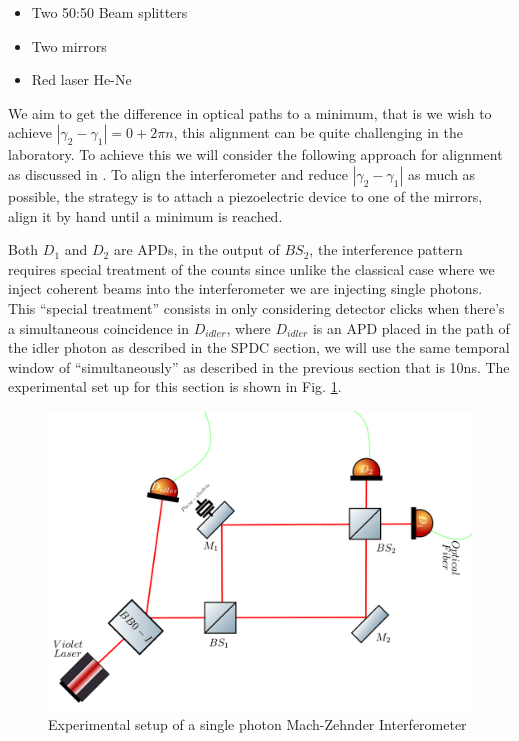 \documentclass[12pt]{book}
\begin{document}
\begin{itemize}
\item Two 50:50 Beam splitters
\item Two mirrors
\item Red laser He-Ne

\end{itemize}

We aim to get the difference in optical paths to a minimum, that is we wish to achieve $|\gamma_{2}-\gamma_{1}|=0+2\pi n$, this alignment can be quite challenging in the laboratory. To achieve this we will consider the following approach for alignment as discussed in \cite{zuri}. To align the interferometer and reduce $|\gamma_{2}-\gamma_{1}|$ as much as possible, the strategy is to attach a piezoelectric device to one of the mirrors, align it by hand  until a minimum is reached.

Both $D_{1}$ and $D_{2}$ are APDs, in the output of  $BS_{2}$, the interference pattern requires special treatment of the counts since unlike the classical case where we inject coherent beams into the interferometer we are injecting single photons. This ``special treatment'' consists in only considering detector clicks when there's a simultaneous coincidence in $D_{idler}$, where $D_{idler}$ is an APD placed in the path of the idler photon as described in the SPDC section, we will use the same temporal window of ``simultaneously'' as described in the previous section that is 10ns. The experimental set up for this section is shown in Fig. \ref{newsingle}.


\begin{figure}[H]
\centering
\includegraphics[width=\linewidth]{images/machzehnder_single.png}
\caption{Experimental setup of a single photon Mach-Zehnder Interferometer}
\label{newsingle}
\end{figure}
\end{document}
